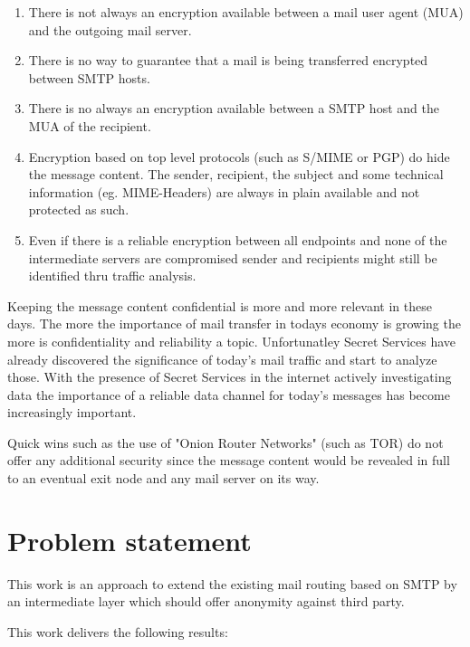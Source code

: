 \documentclass[11pt,a4paper]{book}
\begin{document}
\begin{enumerate}
  \item There is not always an encryption available between a mail user agent (MUA) and the outgoing mail server.
	\item There is no way to guarantee that a mail is being transferred encrypted between SMTP hosts.
	\item There is no always an encryption available between a SMTP host and the MUA of the recipient.
  \item Encryption based on top level protocols (such as S/MIME or PGP) do hide the message content. The sender, recipient, the subject and some technical information (eg. MIME-Headers) are always in plain available and not protected as such.
	\item Even if there is a reliable encryption between all endpoints and none of the intermediate servers are compromised sender and recipients might still be identified thru traffic analysis.
\end{enumerate}

Keeping the message content confidential is more and more relevant in these days. The more the importance of mail transfer in todays economy is growing the more is confidentiality and reliability a topic. Unfortunatley Secret Services have already discovered the significance of today's mail traffic and start to analyze those. With the presence of Secret Services in the internet actively investigating data the importance of a reliable data channel for today's messages has become increasingly important. 

Quick wins such as the use of "Onion Router Networks" (such as TOR) do not offer any additional security since the message content would be revealed in full to an eventual exit node and any mail server on its way.

\section{Problem statement}
This work is an approach to extend the existing mail routing based on SMTP by an intermediate
layer which should offer anonymity against third party.\par

This work delivers the following results:
\end{document}
